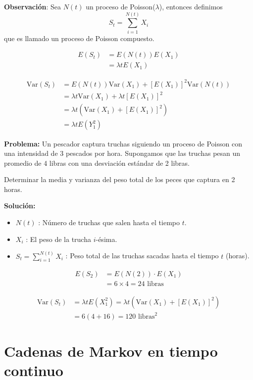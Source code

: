 \documentclass[12pt,a4paper]{article}
\begin{document}
\textbf{Observación}: Sea $N(t)$ un proceso de Poisson($\lambda$), entonces definimos 
\begin{equation*}
S_t = \sum_{i=1}^{N(t)} X_i
\end{equation*}
que es llamado un proceso de Poisson compuesto.

\begin{align*}
E(S_t) &= E(N(t)) E(X_1) \\
&= \lambda t E(X_1)
\end{align*}

\begin{align*}
\text{Var}(S_t) &= E(N(t))\text{Var}(X_1) + [E(X_1)]^2\text{Var}(N(t)) \\
&= \lambda t \text{Var}(X_1) + \lambda t [E(X_1)]^2 \\
&= \lambda t \left(\text{Var}(X_1) + [E(X_1)]^2\right) \\
&= \lambda t E(Y_1^2)
\end{align*}

\textbf{Problema:} Un pescador captura truchas siguiendo un proceso de Poisson con una intensidad de 3 pescados por hora. Supongamos que las truchas pesan un promedio de 4 libras con una desviación estándar de 2 libras.

Determinar la media y varianza del peso total de los peces que captura en 2 horas.

\textbf{Solución:}

\begin{itemize}
    \item $N(t)$ : Número de truchas que salen hasta el tiempo $t$.
    \item $X_i$ : El peso de la trucha $i$-ésima.
    \item $S_t = \sum_{i=1}^{N(t)} X_i$ : Peso total de las truchas sacadas hasta el tiempo $t$ (horas).
\end{itemize}

\begin{align*}
E(S_2) &= E(N(2)) \cdot E(X_1) \\
&= 6 \times 4 = 24 \text{ libras}
\end{align*}

\begin{align*}
\text{Var}(S_t) &= \lambda t E(X_1^2) = \lambda t \left(\text{Var}(X_1) + [E(X_1)]^2\right) \\
&= 6(4 + 16) = 120 \text{ libras}^2
\end{align*}

\section{Cadenas de Markov en tiempo continuo}
\end{document}
